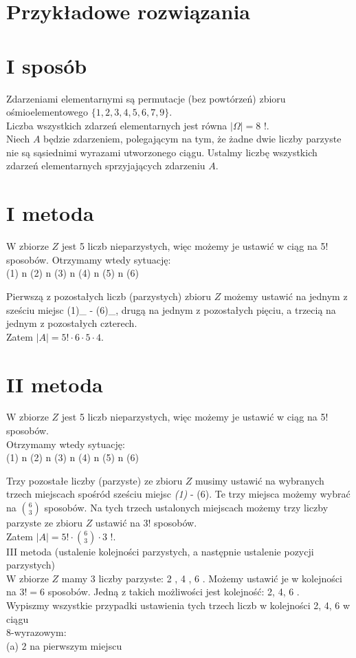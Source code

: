 \documentclass[10pt]{article}
\begin{document}
\section*{Przykładowe rozwiązania}
\section*{I sposób}
Zdarzeniami elementarnymi są permutacje (bez powtórzeń) zbioru ośmioelementowego $\{1,2,3,4,5,6,7,9\}$.\\
Liczba wszystkich zdarzeń elementarnych jest równa $|\Omega|=8$ !.\\
Niech $A$ będzie zdarzeniem, polegającym na tym, że żadne dwie liczby parzyste nie są sąsiednimi wyrazami utworzonego ciągu. Ustalmy liczbę wszystkich zdarzeń elementarnych sprzyjających zdarzeniu $A$.

\section*{I metoda}
W zbiorze $Z$ jest 5 liczb nieparzystych, więc możemy je ustawić w ciąg na 5! sposobów. Otrzymamy wtedy sytuację:\\
(1) n (2) n (3) n (4) n (5) n (6)

Pierwszą z pozostałych liczb (parzystych) zbioru $Z$ możemy ustawić na jednym z sześciu miejsc (1)\_ - (6)\_, drugą na jednym z pozostałych pięciu, a trzecią na jednym z pozostałych czterech.\\
Zatem $|A|=5!\cdot 6 \cdot 5 \cdot 4$.

\section*{II metoda}
W zbiorze $Z$ jest 5 liczb nieparzystych, więc możemy je ustawić w ciąg na 5! sposobów.\\
Otrzymamy wtedy sytuację:\\
(1) n (2) n (3) n (4) n (5) n (6)

Trzy pozostałe liczby (parzyste) ze zbioru $Z$ musimy ustawić na wybranych trzech miejscach spośród sześciu miejsc \textit{(1)} - (6). Te trzy miejsca możemy wybrać na $\binom{6}{3}$ sposobów. Na tych trzech ustalonych miejscach możemy trzy liczby parzyste ze zbioru $Z$ ustawić na 3! sposobów.\\
Zatem $|A|=5!\cdot\binom{6}{3} \cdot 3$ !.\\
III metoda (ustalenie kolejności parzystych, a następnie ustalenie pozycji parzystych)\\
W zbiorze $Z$ mamy 3 liczby parzyste: 2 , 4 , 6 . Możemy ustawić je w kolejności na $3!=6$ sposobów. Jedną z takich możliwości jest kolejność: 2, 4, 6 .\\
Wypiszmy wszystkie przypadki ustawienia tych trzech liczb w kolejności 2, 4, 6 w ciągu\\
8-wyrazowym:\\
(a) 2 na pierwszym miejscu
\end{document}
